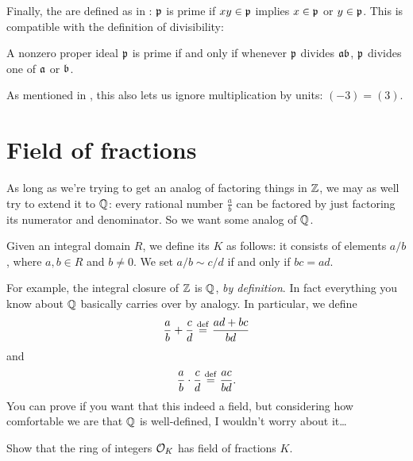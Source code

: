 Finally, the  are defined as in :
$\pp$ is prime if $xy \in \pp$ implies $x \in \pp$ or $y \in \pp$.
This is compatible with the definition of divisibility:
\begin{exercise}
	A nonzero proper ideal $\pp$ is prime
	if and only if whenever $\pp$ divides $\aa \bb$,
	$\pp$ divides one of $\aa$ or $\bb$.
\end{exercise}
As mentioned in ,
this also lets us ignore multiplication by units: $(-3) = (3)$.

\section{Field of fractions}
As long as we're trying to get an analog of factoring things in $\ZZ$,
we may as well try to extend it to $\QQ$: every rational number $\frac ab$ can be
factored by just factoring its numerator and denominator.
So we want some analog of $\QQ$.

Given an integral domain $R$, we define its  $K$ as follows:
it consists of elements $a / b$, where $a,b \in R$ and $b \neq 0$.
We set $a / b \sim c / d$ if and only if $bc = ad$.

For example, the integral closure of $\ZZ$ is $\QQ$, \emph{by definition}.
In fact everything you know about $\QQ$ basically carries over by analogy.
In particular, we define
\[ \frac ab + \frac cd \defeq \frac{ad+bc}{bd} \]
and
\[ \frac ab \cdot \frac cd \defeq \frac{ac}{bd}. \]
You can prove if you want that this indeed a field, but 
considering how comfortable we are that $\QQ$ is well-defined,
I wouldn't worry about it\dots

\begin{ques}
	Show that the ring of integers $\OO_K$ has field of fractions $K$.
\end{ques}

